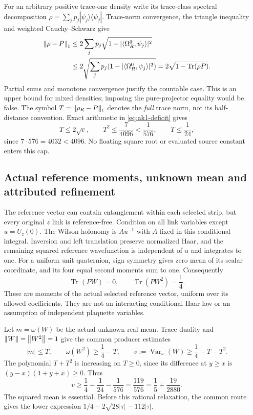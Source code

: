 For an arbitrary positive trace-one density write its trace-class spectral decomposition $\rho=\sum_jp_j|\psi_j\rangle\langle\psi_j|$. Trace-norm convergence, the triangle inequality and weighted Cauchy--Schwarz give
\begin{align}
 \left\lVert\rho-P\right\rVert_1
 &\le2\sum_jp_j\sqrt{1-|\langle\Omega_R^0,\psi_j\rangle|^2}\\
 &\le2\sqrt{\sum_jp_j(1-|\langle\Omega_R^0,\psi_j\rangle|^2)}
 =2\sqrt{1-\operatorname{Tr}(\rho P)}.
 \label{eq:ak1-trace}
\end{align}
Partial sums and monotone convergence justify the countable case. This is an upper bound for mixed densities; imposing the pure-projector equality would be false. The symbol $T=\left\lVert\rho_R-P\right\rVert_1$ denotes the \emph{full} trace norm, not its half-distance convention. Exact arithmetic in \eqref{eq:ak1-deficit} gives
\begin{equation}
 T\le2\sqrt e,\qquad T^2\le\frac7{4096}<\frac1{576},
 \qquad T\le\frac1{24},
 \label{eq:ak1-trace-cap}
\end{equation}
since $7\cdot576=4032<4096$. No floating square root or evaluated source constant enters this cap.

\subsection{Actual reference moments, unknown mean and attributed refinement}
The reference vector can contain entanglement within each selected strip, but every original $z$ link is reference-free. Condition on all link variables except $u=U_z(0)$. The Wilson holonomy is $Au^{-1}$ with $A$ fixed in this conditional integral. Inversion and left translation preserve normalized Haar, and the remaining squared reference wavefunction is independent of $u$ and integrates to one. For a uniform unit quaternion, sign symmetry gives zero mean of its scalar coordinate, and its four equal second moments sum to one. Consequently
\begin{equation}
 \operatorname{Tr}(PW)=0,\qquad
 \operatorname{Tr}(PW^2)=\frac14.
 \label{eq:ak1-reference-moments}
\end{equation}
These are moments of the actual selected reference vector, uniform over its allowed coefficients. They are not an interacting conditional Haar law or an assumption of independent plaquette variables.

Let $m=\omega(W)$ be the actual unknown real mean. Trace duality and $\left\lVert W\right\rVert=\left\lVert W^2\right\rVert=1$ give the common producer estimates
\begin{equation}
 |m|\le T,\qquad \omega(W^2)\ge\frac14-T,\qquad
 v:=\operatorname{Var}_\omega(W)\ge\frac14-T-T^2.
 \label{eq:ak1-moments}
\end{equation}
The polynomial $T+T^2$ is increasing on $T\ge0$, since its difference at $y\ge x$ is $(y-x)(1+y+x)\ge0$. Thus
\begin{equation}
 v\ge\frac14-\frac1{24}-\frac1{576}
    =\frac{119}{576}=\frac15+\frac{19}{2880}.
 \label{eq:ak1-producer-floor}
\end{equation}
The squared mean is essential. Before this rational relaxation, the common route gives the lower expression $1/4-2\sqrt{28|\tau|}-112|\tau|$.

